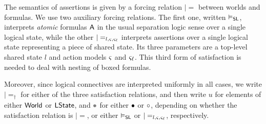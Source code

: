 

The semantics of \colosl assertions is given by a forcing relation
$|=$ between worlds and formulas. We use two auxiliary forcing
relations. The first one, written $\mathrel{\vDash_{\mathsf{SL}}}$, interprets \emph{atomic}
formulas $\mathsf{A}$ in the usual separation logic sense over a single
logical state, while the other $|=_{l,\varsigma_{},\varsigma_{\ell}}$ interprets
assertions over a single logical state representing a piece of shared
state. Its three parameters are a top-level shared state $l$ and
action models $\varsigma_{}$ and $\varsigma_{\ell}$. This third form of
satisfaction is needed to deal with nesting of boxed formulas.

Moreover, since logical connectives are interpreted uniformly in all
cases, we write $|=_\dagger$ for either of the three satisfaction
relations, and then write $u$ for elements of either $\textsf{World}$ or
$\textsf{LState}$, and $\gray$ for either $\bullet$ or $\circ$,
depending on whether the satisfaction relation is
$|=$, or either $\mathrel{\vDash_{\mathsf{SL}}}$ or $|=_{l,\varsigma_{},\varsigma_{\ell}}$,
respectively.

